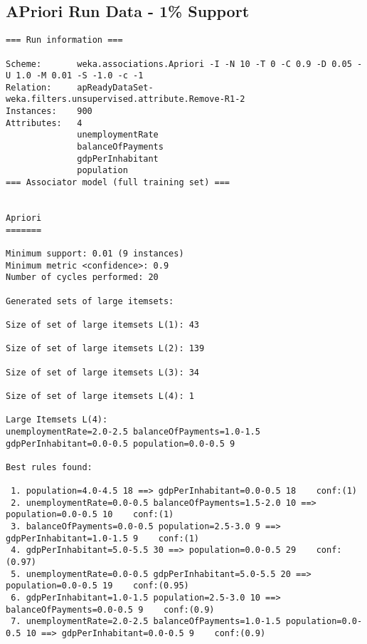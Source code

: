 \subsection{APriori Run Data - 1\% Support}
\begin{lstlisting}[basicstyle=\footnotesize\ttfamily,numbers=none]
=== Run information ===

Scheme:       weka.associations.Apriori -I -N 10 -T 0 -C 0.9 -D 0.05 -U 1.0 -M 0.01 -S -1.0 -c -1
Relation:     apReadyDataSet-weka.filters.unsupervised.attribute.Remove-R1-2
Instances:    900
Attributes:   4
              unemploymentRate
              balanceOfPayments
              gdpPerInhabitant
              population
=== Associator model (full training set) ===


Apriori
=======

Minimum support: 0.01 (9 instances)
Minimum metric <confidence>: 0.9
Number of cycles performed: 20

Generated sets of large itemsets:

Size of set of large itemsets L(1): 43

Size of set of large itemsets L(2): 139

Size of set of large itemsets L(3): 34

Size of set of large itemsets L(4): 1

Large Itemsets L(4):
unemploymentRate=2.0-2.5 balanceOfPayments=1.0-1.5 gdpPerInhabitant=0.0-0.5 population=0.0-0.5 9

Best rules found:

 1. population=4.0-4.5 18 ==> gdpPerInhabitant=0.0-0.5 18    conf:(1)
 2. unemploymentRate=0.0-0.5 balanceOfPayments=1.5-2.0 10 ==> population=0.0-0.5 10    conf:(1)
 3. balanceOfPayments=0.0-0.5 population=2.5-3.0 9 ==> gdpPerInhabitant=1.0-1.5 9    conf:(1)
 4. gdpPerInhabitant=5.0-5.5 30 ==> population=0.0-0.5 29    conf:(0.97)
 5. unemploymentRate=0.0-0.5 gdpPerInhabitant=5.0-5.5 20 ==> population=0.0-0.5 19    conf:(0.95)
 6. gdpPerInhabitant=1.0-1.5 population=2.5-3.0 10 ==> balanceOfPayments=0.0-0.5 9    conf:(0.9)
 7. unemploymentRate=2.0-2.5 balanceOfPayments=1.0-1.5 population=0.0-0.5 10 ==> gdpPerInhabitant=0.0-0.5 9    conf:(0.9)
\end{lstlisting}
